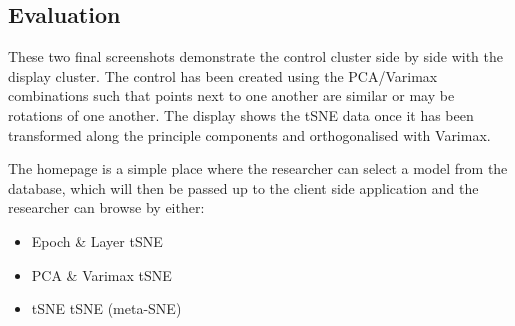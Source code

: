 \documentclass[a4paper,11pt,titlepage]{article}
\begin{document}
\subsection{Evaluation}
These two final screenshots demonstrate the control cluster side by side with the display cluster. The control has been created using the PCA/Varimax combinations such that points next to one another are similar or may be rotations of one another. The display shows the tSNE data once it has been transformed along the principle components and orthogonalised with Varimax. 
\par 
The homepage is a simple place where the researcher can select a model from the database, which will then be passed up to the client side application and the researcher can browse by either:
\begin{itemize}
	\item Epoch \& Layer tSNE
	\item PCA \& Varimax tSNE
	\item tSNE tSNE (meta-SNE)
\end{itemize}

	\begin{figure}[H]
    			\centering	
    			 \qquad
    			\caption{}%
    			\label{fig:pca_varimax}
	\end{figure}
\end{document}
